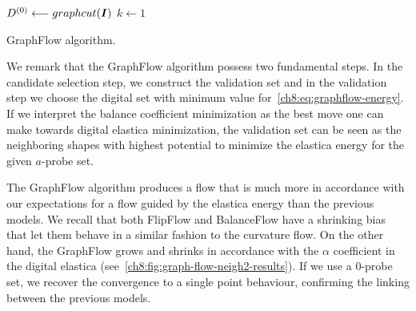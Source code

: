 \begin{algorithm}
 
 \BlankLine
 {
	 $D^{(0)} \longleftarrow graphcut(\bm{I})$\;  
 }
 \BlankLine
 $k \longleftarrow 1$\;
 \caption{GraphFlow algorithm.}
 \label{ch8:alg:graphflow-algorithm}  
\end{algorithm}

We remark that the GraphFlow algorithm possess two fundamental steps. In the candidate selection step, we construct the validation set and in the validation step we choose the digital set with minimum value for~\cref{ch8:eq:graphflow-energy}. If we interpret the balance coefficient minimization as the best move one can make towards digital elastica minimization, the validation set can be seen as the neighboring shapes with highest potential to minimize the elastica energy for the given $a$-probe set.


The GraphFlow algorithm produces a flow that is much more in accordance with our expectations for a flow guided by the elastica energy than the previous models. We recall that both FlipFlow and BalanceFlow have a shrinking bias that let them behave in a similar fashion to the curvature flow. On the other hand, the GraphFlow grows and shrinks in accordance with the $\alpha$ coefficient in the digital elastica (see~\cref{ch8:fig:graph-flow-neigh2-results}). If we use a $0$-probe set, we recover the convergence to a single point behaviour, confirming the linking between the previous models. 

